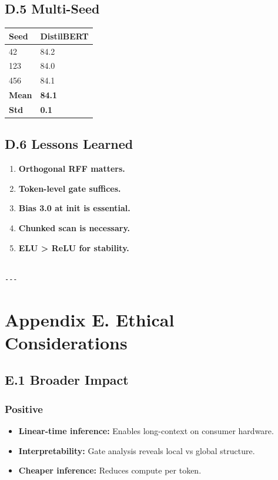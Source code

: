\subsection{D.5 Multi-Seed}

\begin{table}[H]
\centering
\small
\begin{tabular}{ll}
\toprule
\textbf{Seed} & \textbf{DistilBERT} \\
\midrule
42 & 84.2 \\
123 & 84.0 \\
456 & 84.1 \\
\textbf{Mean} & \textbf{84.1} \\
\textbf{Std} & \textbf{0.1} \\
\bottomrule
\end{tabular}
\end{table}

\subsection{D.6 Lessons Learned}

\begin{enumerate}
\item \textbf{Orthogonal RFF matters.}
\item \textbf{Token-level gate suffices.}
\item \textbf{Bias 3.0 at init is essential.}
\item \textbf{Chunked scan is necessary.}
\item \textbf{ELU > ReLU for stability.}
\end{enumerate}
\begin{lstlisting}

---
\end{lstlisting}


\section{Appendix E. Ethical Considerations}

\subsection{E.1 Broader Impact}

\subsubsection{Positive}
\begin{itemize}
\item \textbf{Linear-time inference:} Enables long-context on consumer hardware.
\item \textbf{Interpretability:} Gate analysis reveals local vs global structure.
\item \textbf{Cheaper inference:} Reduces compute per token.

\end{itemize}

